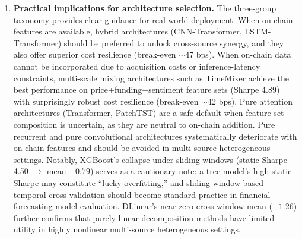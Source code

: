 \documentclass[a4paper]{cas-dc}
\begin{document}
\begin{enumerate}[label=(\arabic*),leftmargin=1.5em]
    

    Break-even fees (Table~\ref{tab:cost_sensitivity}): hybrid architectures (CNN-Transformer 47 bps, LSTM-Transformer 46 bps) substantially outperform the pure Transformer (27 bps); at 20 bps their Sharpe decay (36--37\%) is far lower than the Transformer's 68\%. TimeMixer shows surprisingly robust cost resilience (break-even $\sim$42 bps) despite its inability to exploit on-chain data---its moderate turnover (11.0\%) limits transaction-cost erosion. At the opposite extreme, DLinear's break-even is merely $\sim$7 bps, driven by an unsustainable 46.0\% turnover rate (flipping positions approximately every 9 hours). Turnover data (Table~\ref{tab:turnover}) reveals the behavioral root of cost resilience: the CNN-Transformer's 17.9\% turnover lies in the medium-frequency sweet spot, while pure convolutional architectures reach 26--27\% and DLinear churns at 46.0\%. TimeMixer and LSTM-Transformer achieve the lowest turnover (11.0\% and 7.9\%) among deep models, consistent with their more conservative signal generation.

    

    \item \textbf{Practical implications for architecture selection.} The three-group taxonomy provides clear guidance for real-world deployment. When on-chain features are available, hybrid architectures (CNN-Transformer, LSTM-Transformer) should be preferred to unlock cross-source synergy, and they also offer superior cost resilience (break-even $\sim$47 bps). When on-chain data cannot be incorporated due to acquisition costs or inference-latency constraints, multi-scale mixing architectures such as TimeMixer achieve the best performance on price+funding+sentiment feature sets (Sharpe 4.89) with surprisingly robust cost resilience (break-even $\sim$42 bps). Pure attention architectures (Transformer, PatchTST) are a safe default when feature-set composition is uncertain, as they are neutral to on-chain addition. Pure recurrent and pure convolutional architectures systematically deteriorate with on-chain features and should be avoided in multi-source heterogeneous settings. Notably, XGBoost's collapse under sliding windows (static Sharpe 4.50 $\to$ mean $-0.79$) serves as a cautionary note: a tree model's high static Sharpe may constitute ``lucky overfitting,'' and sliding-window-based temporal cross-validation should become standard practice in financial forecasting model evaluation. DLinear's near-zero cross-window mean ($-1.26$) further confirms that purely linear decomposition methods have limited utility in highly nonlinear multi-source heterogeneous settings.
\end{enumerate}
\end{document}
